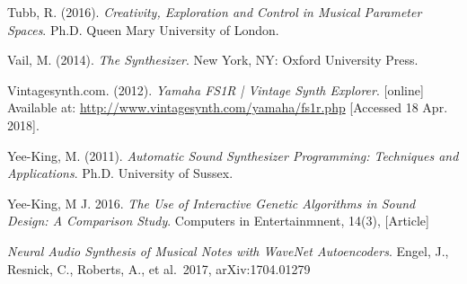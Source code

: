\documentclass[11pt, oneside]{report}   	%
\begin{document}
\begin{thebibliography}{9}
Tubb, R. (2016). \emph{Creativity, Exploration and Control in Musical Parameter Spaces}. Ph.D. Queen Mary University of London.

Vail, M. (2014). \emph{The Synthesizer}. New York, NY: Oxford University Press.

Vintagesynth.com. (2012). \emph{Yamaha FS1R | Vintage Synth Explorer}. [online] Available at: \url{http://www.vintagesynth.com/yamaha/fs1r.php} [Accessed 18 Apr. 2018].

Yee-King, M. (2011). \emph{Automatic Sound Synthesizer Programming: Techniques and Applications}. Ph.D. University of Sussex.

Yee-King, M J. 2016. \emph{The Use of Interactive Genetic Algorithms in Sound Design: A Comparison Study}. Computers in Entertainmnent, 14(3), [Article]

 \emph{Neural Audio Synthesis of Musical Notes with WaveNet Autoencoders}. Engel, J., Resnick, C., Roberts, A., et al.\ 2017, arXiv:1704.01279 




\end{thebibliography}
\end{document}
